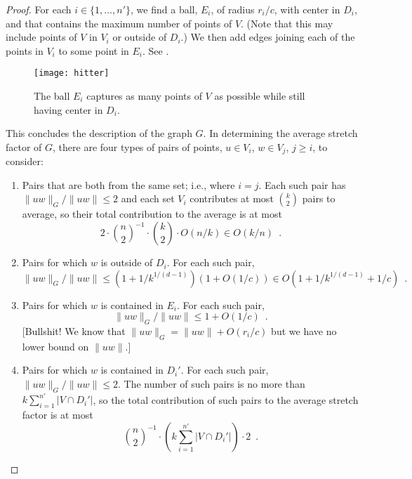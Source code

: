 \documentclass{patmorin}
\begin{document}
\begin{proof}
  For each $i\in\{1,\ldots,n'\}$, we find a ball, $E_i$, of radius
  $r_i/c$, with center in $D_i$, and that contains the maximum number
  of points of $V$.  (Note that this may include points of $V$ in $V_i$
  or outside of $D_i$.)  We then add edges joining each of the points
  in $V_i$ to some point in $E_i$.  See .

  \begin{figure}
    \begin{center}
      \texttt{[image: hitter]}
    \end{center}
    \caption{The ball $E_i$ captures as many points of $V$ as possible
     while still having center in $D_i$.}
  \end{figure}

  This concludes the description of the graph $G$.  In determining the
  average stretch factor of $G$, there are four types of pairs of points,
  $u\in V_i$, $w\in V_j$, $j\ge i$, to consider:
  \begin{enumerate}
    \item Pairs that are both from the same set; i.e., where $i=j$.  Each such
      pair has $\|uw\|_G/\|uw\|\le 2$ and each set $V_i$ contributes at
      most $\binom{k}{2}$ pairs to average, so their total contribution
      to the average is at most
      \[
        2\cdot\binom{n}{2}^{-1}\cdot\binom{k}{2}\cdot O(n/k) \in O(k/n)
        \enspace .
      \]
    \item Pairs for which $w$ is outside of $D_i$.  For each
      such pair, 
      \[
        \|uw\|_G/\|uw\|\le (1+1/k^{1/(d-1)})(1+O(1/c)) 
           \in O(1+1/k^{1/(d-1)}+1/c) \enspace .
      \]
    \item Pairs for which $w$ is contained in $E_i$.  For each
      such pair, 
      \[
        \|uw\|_G/\|uw\|\le 1+O(1/c) \enspace .
      \]
    [Bullshit! We know that $\|uw\|_G=\|uw\|+O(r_i/c)$ but we have
     no lower bound on $\|uw\|$.]
    \item Pairs for which $w$ is contained in $D_i'$.  For each
      such pair, $\|uw\|_G/\|uw\|\le 2$.  The number of such pairs is no
      more than $k\sum_{i=1}^{n'}|V\cap D_i'|$, so the total contribution
      of such pairs to the average stretch factor is at most
      \[
            \binom{n}{2}^{-1}\cdot\left(k\sum_{i=1}^{n'} |V\cap D_i'|\right)\cdot 2 \enspace .
      \]
  \end{enumerate}


\end{proof}
\end{document}
